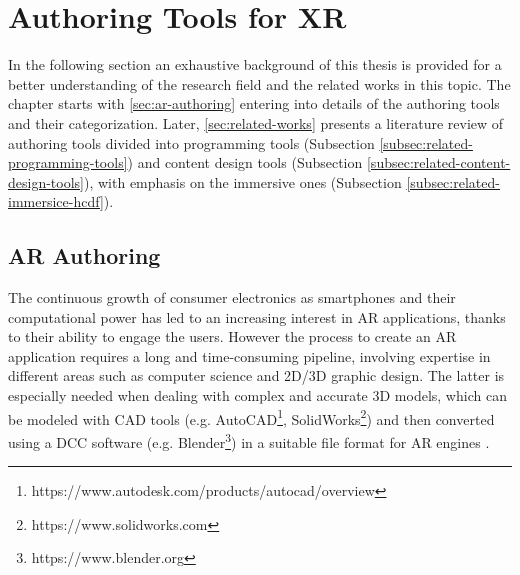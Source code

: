 \section{Authoring Tools for XR}
\label{sec:background-authoring}

In the following section an exhaustive background of this thesis is provided for a better understanding of the research field and the related works in this topic. The chapter starts with \autoref{sec:ar-authoring} entering into details of the authoring tools and their categorization. Later, \autoref{sec:related-works} presents a literature review of authoring tools divided into programming tools (Subsection \autoref{subsec:related-programming-tools}) and content design tools (Subsection \autoref{subsec:related-content-design-tools}), with emphasis on the immersive ones (Subsection \autoref{subsec:related-immersice-hcdf}).

\subsection{AR Authoring}
\label{sec:ar-authoring}
The continuous growth of consumer electronics as smartphones and their computational power has led to an increasing interest in AR applications, thanks to their ability to engage the users.
However the process to create an AR application requires a long and time-consuming pipeline, involving expertise in different areas such as computer science and 2D/3D graphic design. The latter is especially needed when dealing with complex and accurate 3D models, which can be modeled with CAD tools (e.g. AutoCAD\footnote{https://www.autodesk.com/products/autocad/overview}, SolidWorks\footnote{https://www.solidworks.com}) and then converted using a DCC software (e.g. Blender\footnote{https://www.blender.org}) in a suitable file format for AR engines \cite{de_paolis_waat_2020}.

